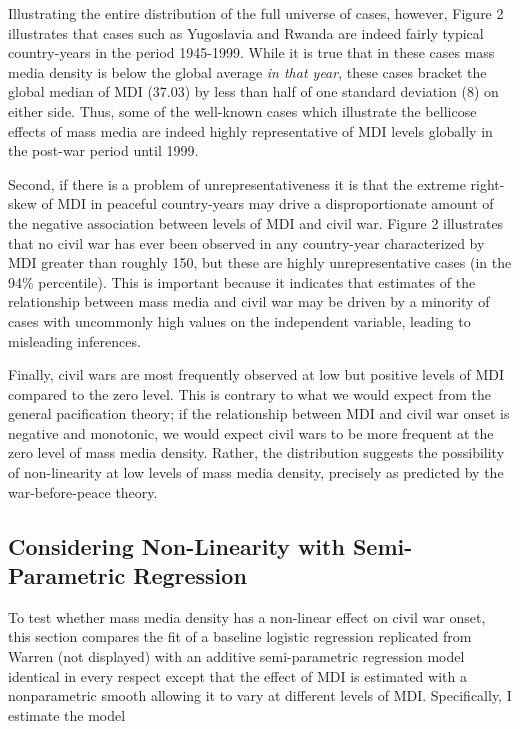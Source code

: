 \documentclass[11pt,article,oneside]{memoir}
\begin{document}
Illustrating the entire distribution of the full universe of cases,
however, Figure 2 illustrates that cases such as Yugoslavia and Rwanda
are indeed fairly typical country-years in the period 1945-1999. While
it is true that in these cases mass media density is below the global
average \emph{in that year}, these cases bracket the global median of
MDI (37.03) by less than half of one standard deviation (8) on either
side. Thus, some of the well-known cases which illustrate the bellicose
effects of mass media are indeed highly representative of MDI levels
globally in the post-war period until 1999.

Second, if there is a problem of unrepresentativeness it is that the
extreme right-skew of MDI in peaceful country-years may drive a
disproportionate amount of the negative association between levels of
MDI and civil war. Figure 2 illustrates that no civil war has ever been
observed in any country-year characterized by MDI greater than roughly
150, but these are highly unrepresentative cases (in the 94\%
percentile). This is important because it indicates that estimates of
the relationship between mass media and civil war may be driven by a
minority of cases with uncommonly high values on the independent
variable, leading to misleading inferences.

Finally, civil wars are most frequently observed at low but positive
levels of MDI compared to the zero level. This is contrary to what we
would expect from the general pacification theory; if the relationship
between MDI and civil war onset is negative and monotonic, we would
expect civil wars to be more frequent at the zero level of mass media
density. Rather, the distribution suggests the possibility of
non-linearity at low levels of mass media density, precisely as
predicted by the war-before-peace theory.

\subsection{Considering Non-Linearity with Semi-Parametric
Regression}\label{considering-non-linearity-with-semi-parametric-regression}

To test whether mass media density has a non-linear effect on civil war
onset, this section compares the fit of a baseline logistic regression
replicated from Warren (not displayed) with an additive semi-parametric
regression model identical in every respect except that the effect of
MDI is estimated with a nonparametric smooth allowing it to vary at
different levels of MDI. Specifically, I estimate the model
\end{document}
